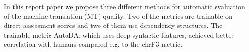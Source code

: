 In this report paper we propose three different methods for automatic evaluation of the machine translation (MT) quality. Two of the metrics are trainable on direct-assessment scores and two of them use dependency structures. The trainable metric AutoDA, which uses deep-syntactic features, achieved better correlation with humans compared e.g. to the chrF3 metric.
